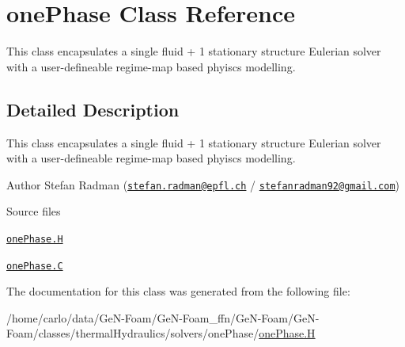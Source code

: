 \hypertarget{classFoam_1_1onePhase}{}\section{one\+Phase Class Reference}
\label{classFoam_1_1onePhase}


This class encapsulates a single fluid + 1 stationary structure Eulerian solver with a user-\/defineable regime-\/map based phyiscs modelling.  




\subsection{Detailed Description}
This class encapsulates a single fluid + 1 stationary structure Eulerian solver with a user-\/defineable regime-\/map based phyiscs modelling. 

\label{_Description}%
 Author Stefan Radman (\href{mailto:stefan.radman@epfl.ch}{\tt stefan.\+radman@epfl.\+ch} / \href{mailto:stefanradman92@gmail.com}{\tt stefanradman92@gmail.\+com})

\begin{DoxyParagraph}{Source files}

\begin{DoxyItemize}
\item \href{../../../home/carlo/data/GeN-Foam/GeN-Foam_ffn/GeN-Foam/GeN-Foam/classes/thermalHydraulics/solvers/onePhase/onePhase.H}{\tt one\+Phase.\+H} 
\item \href{../../../home/carlo/data/GeN-Foam/GeN-Foam_ffn/GeN-Foam/GeN-Foam/classes/thermalHydraulics/solvers/onePhase/onePhase.C}{\tt one\+Phase.\+C} 
\end{DoxyItemize}
\end{DoxyParagraph}


The documentation for this class was generated from the following file\+:\begin{DoxyCompactItemize}
\item 
/home/carlo/data/\+Ge\+N-\/\+Foam/\+Ge\+N-\/\+Foam\+\_\+ffn/\+Ge\+N-\/\+Foam/\+Ge\+N-\/\+Foam/classes/thermal\+Hydraulics/solvers/one\+Phase/\hyperlink{onePhase_8H}{one\+Phase.\+H}\end{DoxyCompactItemize}

